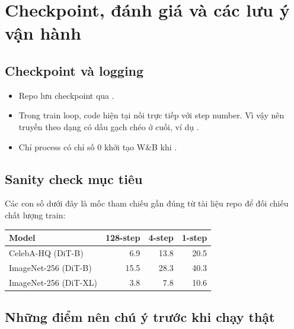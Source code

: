 \section{Checkpoint, đánh giá và các lưu ý vận hành}

\subsection{Checkpoint và logging}

\begin{itemize}
    \item Repo lưu checkpoint qua .
    \item Trong train loop, code hiện tại nối trực tiếp  với step number. Vì vậy nên truyền
     theo dạng có dấu gạch chéo ở cuối, ví dụ .
    \item Chỉ process có chỉ số \(0\) khởi tạo W\&B khi .
\end{itemize}

\subsection{Sanity check mục tiêu}

Các con số dưới đây là mốc tham chiếu gần đúng từ tài liệu repo để đối chiếu chất lượng train:

\begin{center}
\begin{tabular}{p{} r r r}
\toprule
\textbf{Model} & \textbf{128-step} & \textbf{4-step} & \textbf{1-step} \\
\midrule
CelebA-HQ (DiT-B) & 6.9 & 13.8 & 20.5 \\
ImageNet-256 (DiT-B) & 15.5 & 28.3 & 40.3 \\
ImageNet-256 (DiT-XL) & 3.8 & 7.8 & 10.6 \\
\bottomrule
\end{tabular}
\end{center}

\subsection{Những điểm nên chú ý trước khi chạy thật}

